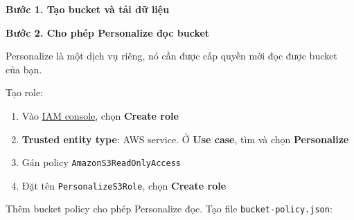 \vspace{0.5em}\noindent\textbf{Bước 1. Tạo bucket và tải dữ
liệu}\par

\begin{Shaded}
\begin{Highlighting}[]
\OperatorTok{\textless{}}\OperatorTok{\textgreater{}}
\OperatorTok{\textless{}}\OperatorTok{\textgreater{}}
\OperatorTok{\textless{}}\OperatorTok{\textgreater{}}
\end{Highlighting}
\end{Shaded}

\vspace{0.5em}\noindent\textbf{Bước 2. Cho phép Personalize đọc
bucket}\par

Personalize là một dịch vụ riêng, nó cần được cấp quyền mới đọc được
bucket của bạn.

Tạo role:

\begin{enumerate}
\def\labelenumi{\arabic{enumi}.}
\tightlist
\item
  Vào \href{https://console.aws.amazon.com/iam/home\#/roles}{IAM
  console}, chọn \textbf{Create role}
\item
  \textbf{Trusted entity type}: AWS service. Ở \textbf{Use case}, tìm và
  chọn \textbf{Personalize}
\item
  Gán policy \texttt{AmazonS3ReadOnlyAccess}
\item
  Đặt tên \texttt{PersonalizeS3Role}, chọn \textbf{Create role}
\end{enumerate}

Thêm bucket policy cho phép Personalize đọc. Tạo file
\texttt{bucket-policy.json}:

\begin{Shaded}
\begin{Highlighting}[]
\FunctionTok{\{}
  \FunctionTok{:} \FunctionTok{,}
  \FunctionTok{:} \OtherTok{[}\FunctionTok{\{}
    \FunctionTok{:} \FunctionTok{,}
    \FunctionTok{:} \FunctionTok{\{} \FunctionTok{:}  \FunctionTok{\},}
    \FunctionTok{:} \OtherTok{[}\OtherTok{,} \OtherTok{]}\FunctionTok{,}
    \FunctionTok{:} \OtherTok{[}
      \OtherTok{,}
    \OtherTok{]}
  \FunctionTok{\}}\OtherTok{]}
\FunctionTok{\}}
\end{Highlighting}
\end{Shaded}

